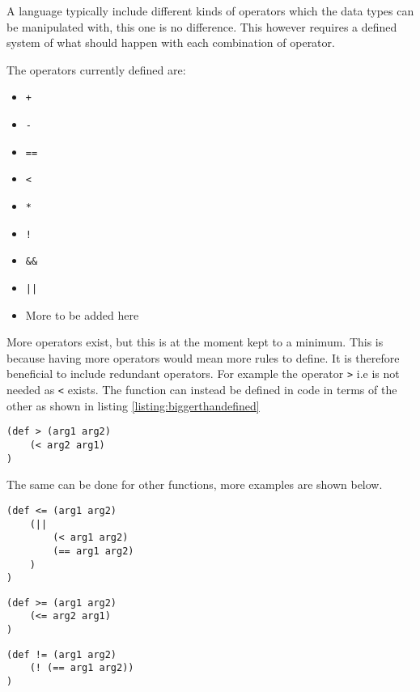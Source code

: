 A language typically include different kinds of operators which the data types can be manipulated with, this one is no difference.
This however requires a defined system of what should happen with each combination of operator. 

The operators currently defined are:
\begin{itemize}
	\item \texttt{+}
	\item \texttt{-}
	\item \texttt{==}
	\item \texttt{<}
	\item \texttt{*}
	\item \texttt{!}
	\item \texttt{\&\&}
	\item \texttt{||}
	\item More to be added here
\end{itemize}

More operators exist, but this is at the moment kept to a minimum. 
This is because having more operators would mean more rules to define. 
It is therefore beneficial to include redundant operators. 
For example the operator \texttt{>} i.e is not needed as \texttt{<} exists.
The function can instead be defined in code in terms of the other as shown in listing \ref{listing:biggerthandefined}

\begin{lstlisting}[caption=Bigger than function defined in terms of less than,
label=listing:biggerthandefined]
(def > (arg1 arg2)
	(< arg2 arg1)
)
\end{lstlisting}

The same can be done for other functions, more examples are shown below.

\begin{lstlisting}[caption=Less than or equal to defined with the OR operator]
(def <= (arg1 arg2)
	(|| 
		(< arg1 arg2)
		(== arg1 arg2)
	)
)
\end{lstlisting}

\begin{lstlisting}[caption=More than or equal to defined with less than or equal to]
(def >= (arg1 arg2)
	(<= arg2 arg1) 
)
\end{lstlisting}

\begin{lstlisting}[caption=Definition for is not equal with the invert operator]
(def != (arg1 arg2)
	(! (== arg1 arg2))
)
\end{lstlisting}


